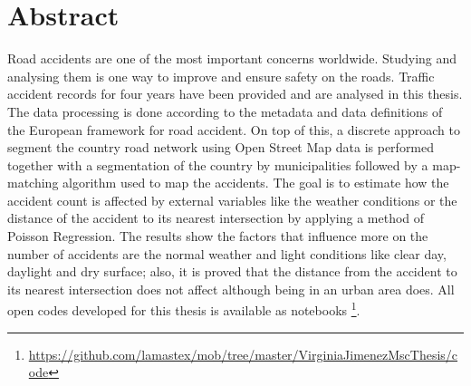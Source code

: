 \chapter*{Abstract}
Road accidents are one of the most important concerns worldwide. Studying and analysing them is one way to improve and ensure safety on the roads. Traffic accident records for four years have been provided and are analysed in this thesis. The data processing is done according to the metadata and data definitions of the European framework for road accident. On top of this, a discrete approach to segment the country road network using Open Street Map data is performed together with a segmentation of the country by municipalities followed by a map-matching algorithm used to map the accidents. The goal is to estimate how the accident count is affected by external variables like the weather conditions or the distance of the accident to its nearest intersection by applying a method of Poisson Regression. The results show the factors that influence more on the number of accidents are the normal weather and light conditions like clear day, daylight and dry surface; also, it is proved that the distance from the accident to its nearest intersection does not affect although being in an urban area does. 
All open codes developed for this thesis is available as notebooks \footnote{\url{https://github.com/lamastex/mob/tree/master/VirginiaJimenezMscThesis/code}}.